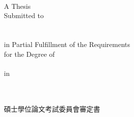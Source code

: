 \begin{center}
\renewcommand{\baselinestretch}{\mybaselinestretch}   %
\large %
%
\vfill
\makebox[4cm][s]{\large{\univCname}}\\%
\makebox[6cm][s]{\large{\deptCname}}\\%
\\%
%
\vfill
\large{A Thesis}\\%
\large{Submitted to }%
%
\large{\fulldeptEname}\\%
%
%
\ifx \collEname  \itsempty
\relax %
\else
\large{\collEname}\\%
\fi
%
\large{\univEname}\\%
%
\large{in Partial Fulfillment of the Requirements}\\
%
\large{for the Degree of}\\
%
\large{\degreeEname}\\%
%
\large{in}\\
%
\large{\deptEname}\\%
%
\large{\eMonth\ \eYear}\\%
%
\large{\ePlace}%
\vfill
{}
\end{center}
\normalsize
\clearpage
%
\newpage%
\thispagestyle{EmptyWaterMarkPage}  %
%

\begin{center}
\fontsize{24}{36}\selectfont 碩士學位論文考試委員會審定書\\
\vspace{0.5cm}
\end{center}

